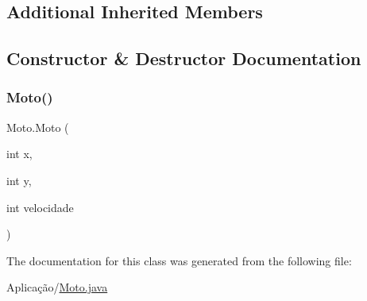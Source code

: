 \subsection*{Additional Inherited Members}


\subsection{Constructor \& Destructor Documentation}
\mbox{\label{class_moto_ab81ca0fb4282aa5bd34f9b9d6902bdbb}} 
\subsubsection{\texorpdfstring{Moto()}{Moto()}}
{\footnotesize\ttfamily Moto.\+Moto (\begin{DoxyParamCaption}\item[{int}]{x,  }\item[{int}]{y,  }\item[{int}]{velocidade }\end{DoxyParamCaption})}



The documentation for this class was generated from the following file\+:\begin{DoxyCompactItemize}
\item 
Aplicação/\mbox{\hyperlink{_moto_8java}{Moto.\+java}}\end{DoxyCompactItemize}

